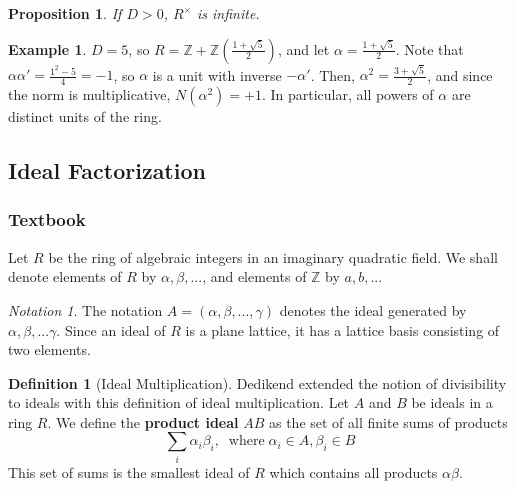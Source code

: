 \documentclass[12pt]{article}
\newtheorem{prop}[thm]{Proposition}
\theoremstyle{definition}
\newtheorem{defn}[thm]{Definition}
\newtheorem{eg}[thm]{Example}
\theoremstyle{remark}
\newtheorem{nota}[thm]{Notation}
\numberwithin{equation}{section}
\newcommand\Z{\mathbb Z}    %
\newcommand\B[1]{\textbf{ #1}}
\begin{document}
\vspace{15pt}

\begin{prop}
        If $D > 0$, $R^{\times}$ is infinite.
\end{prop}

\vspace{15pt}

\begin{eg}
        $D = 5$, so $R = \Z + \Z\left(\frac{1+\sqrt{5}}{2}\right)$, and let $\alpha = \frac{1+\sqrt{5}}{2}$. Note that $\alpha\alpha' = \frac{1^2 - 5}{4} = -1$, so $\alpha$ is a unit with inverse $-\alpha'$. Then, $\alpha^2 = \frac{3+\sqrt{5}}{2}$, and since the norm is multiplicative, $N(\alpha^2) = +1$. In particular, all powers of $\alpha$ are distinct units of the ring.
\end{eg}


\vspace{15pt}



\subsection{Ideal Factorization}

\subsubsection{Textbook}

Let $R$ be the ring of algebraic integers in an imaginary quadratic field. We shall denote elements of $R$ by $\alpha,\beta,...$, and elements of $\Z$ by $a,b,...$


\begin{nota}
        The notation $A = (\alpha,\beta,...,\gamma)$ denotes the ideal generated by $\alpha,\beta,...\gamma$. Since an ideal of $R$ is a plane lattice, it has a lattice basis consisting of two elements.
\end{nota}

\vspace{15pt}

\begin{defn}[Ideal Multiplication]
        Dedikend extended the notion of divisibility to ideals with this definition of ideal multiplication. Let $A$ and $B$ be ideals in a ring $R$. We define the \B{product ideal} $AB$ as the set of all finite sums of products \begin{equation}
                \sum\limits_{i} \alpha_i\beta_i,\;\;\text{where}\;\alpha_i \in A,\beta_i \in B
        \end{equation}
        This set of sums is the smallest ideal of $R$ which contains all products $\alpha\beta$. 
\end{defn}
\end{document}
